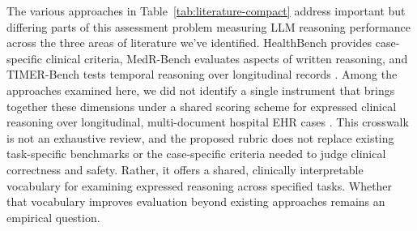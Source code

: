 \documentclass{article}
\begin{document}
The various approaches in Table~\ref{tab:literature-compact} address important
but differing parts of this assessment problem measuring LLM
reasoning performance across the three areas of literature we've identified. HealthBench provides
case-specific clinical criteria, MedR-Bench evaluates aspects of written
reasoning, and TIMER-Bench tests temporal reasoning over longitudinal
records \cite{arora2025healthbench,qiu2025medrbench,cui2025timer}.
Among the approaches examined here, we did not identify a single
instrument that brings together these dimensions under a shared scoring
scheme for expressed clinical reasoning over longitudinal,
multi-document hospital EHR cases
\cite{baker2015,schaye2022,thammasitboon2018art,lubarsky2013,
arora2025healthbench,qiu2025medrbench,cui2025timer,mehandru2025,
gao2023drbench,du2026,adewuyi2026,oukelmoun2025,
zhou2026medthinkbench}. This crosswalk is not an exhaustive review,
and the proposed rubric does not replace existing task-specific
benchmarks or the case-specific criteria needed to judge clinical
correctness and safety. Rather, it offers a shared, clinically
interpretable vocabulary for examining expressed reasoning across
specified tasks. Whether that vocabulary improves evaluation beyond
existing approaches remains an empirical question.
\end{document}
